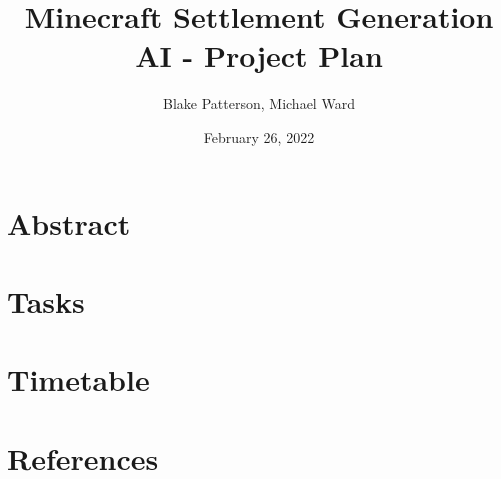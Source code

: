 \documentclass[11pt, oneside]{article}
\begin{document}
\title{Minecraft Settlement Generation AI - Project Plan}
\author{Blake Patterson, Michael Ward}
\date{February 26, 2022}
\maketitle

\newpage
\tableofcontents
\newpage
{}


\section{Abstract}
\label{abstract}

\newpage


\section{Tasks}
\label{tasks}


\newpage


\section{Timetable}
\label{timetable}

\newpage


\section{References}
\label{references}
\nocite{*}
\printbibliography[heading=none]
\end{document}
